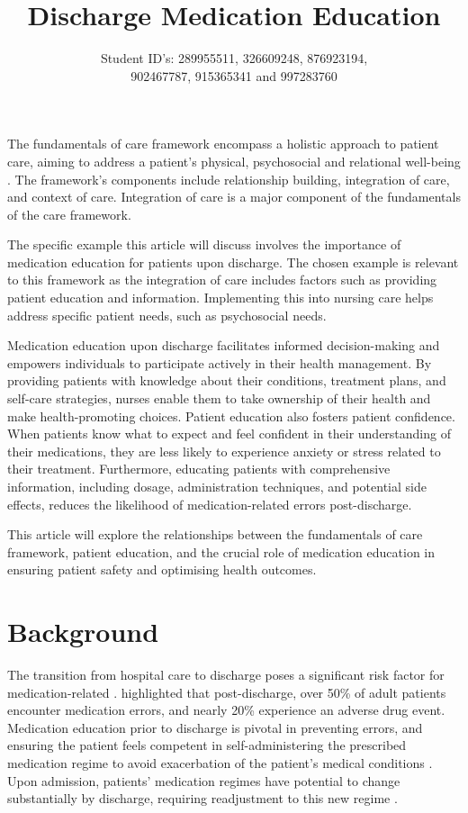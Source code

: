 \documentclass[british,12pt,a4paper]{article}
\title{{\fontsize{14}{15} \textbf{Discharge Medication Education}}}
\author{{\fontsize{14}{15} Student ID's: 289955511, 326609248, 876923194,} \\ {\fontsize{14}{15}902467787, 915365341 and 997283760}}
\date{}
\begin{document}
	\maketitle
	\thispagestyle{fancy}
	The fundamentals of care framework encompass a holistic approach to patient care, aiming to address a patient's physical, psychosocial and relational well-being \parencite{Dempsey2013}.  The framework's components include relationship building, integration of care, and context of care. Integration of care is a major component of the fundamentals of the care framework.

	The specific example this article will discuss involves the importance of medication education for patients upon discharge. The chosen example is relevant to this framework as the integration of care includes factors such as providing patient education and information. Implementing this into nursing care helps address specific patient needs, such as psychosocial needs. 

	Medication education upon discharge facilitates informed decision-making and empowers individuals to participate actively in their health management. By providing patients with knowledge about their conditions, treatment plans, and self-care strategies, nurses enable them to take ownership of their health and make health-promoting choices. Patient education also fosters patient confidence. When patients know what to expect and feel confident in their understanding of their medications, they are less likely to experience anxiety or stress related to their treatment. Furthermore, educating patients with comprehensive information, including dosage, administration techniques, and potential side effects, reduces the likelihood of medication-related errors post-discharge. 

	This article will explore the relationships between the fundamentals of care framework, patient education, and the crucial role of medication education in ensuring patient safety and optimising health outcomes.

	\section{Background}
	The transition from hospital care to discharge poses a significant risk factor for medication-related \parencite{Flatman2021}. \textcite{Alqenae2020} highlighted that post-discharge, over 50\% of adult patients encounter medication errors, and nearly 20\% experience an adverse drug event. Medication education prior to discharge is pivotal in preventing errors, and ensuring the patient feels competent in self-administering the prescribed medication regime to avoid exacerbation of the patient's medical conditions \parencite{Hajialibeigloo2021}. Upon admission, patients' medication regimes have potential to change substantially by discharge, requiring readjustment to this new regime \parencite{Weir2020}. 
\end{document}
